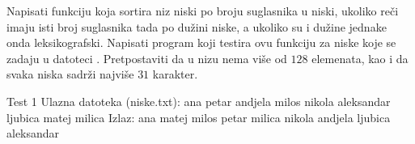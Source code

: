 \begin{Exercise}[label=511]
  Napisati funkciju koja sortira niz niski po broju suglasnika u
  niski, ukoliko reči imaju isti broj suglasnika tada po dužini niske,
  a ukoliko su i dužine jednake onda leksikografski.  Napisati program
  koji testira ovu funkciju za niske koje se zadaju u datoteci
  .  Pretpostaviti da u nizu nema više od $128$
  elemenata, kao i da svaka niska sadrži najviše $31$ karakter.
  
\begin{maxitest}
\begin{test}{Test 1}
Ulazna datoteka (niske.txt):
  ana petar andjela milos nikola aleksandar ljubica matej milica
Izlaz:
  ana matej milos petar milica nikola andjela ljubica aleksandar
\end{test}
\end{maxitest}
  
\end{Exercise}

